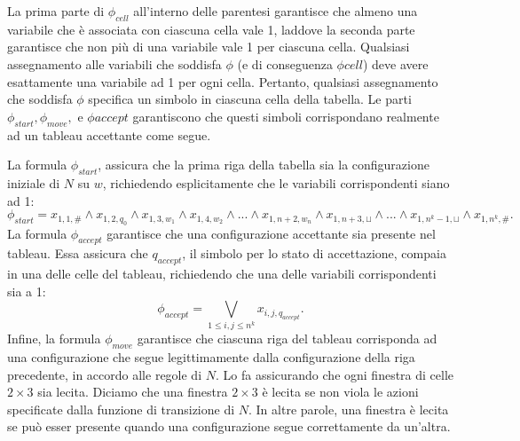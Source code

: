 \documentclass{article}
\begin{document}
La prima parte di $\phi_{cell}$ all'interno delle parentesi garantisce che almeno una variabile che è associata con ciascuna cella vale 1, laddove la seconda parte garantisce che non più di una variabile vale 1 per ciascuna cella.
Qualsiasi assegnamento alle variabili che soddisfa $\phi$ (e di conseguenza $\phi{cell}$) deve avere esattamente una variabile ad 1 per ogni cella.
Pertanto, qualsiasi assegnamento che soddisfa $\phi$ specifica un simbolo in ciascuna cella della tabella. 
Le parti $\phi_{start}, \phi_{move}, \text{ e } \phi{accept}$ garantiscono che questi simboli corrispondano realmente ad un tableau accettante come segue.

La formula $\phi_{start}$, assicura che la prima riga della tabella sia la configurazione iniziale di $N$ su $w$, richiedendo esplicitamente che le variabili corrispondenti siano ad 1:
$$
\phi_{start} = x_{1,1,\#} \land x_{1,2,q_0} \land 
x_{1,3,w_1} \land x_{1,4,w_2} \land ... \land x_{1,n+2,w_n} \land 
x_{1,n+3,\sqcup} \land ... \land x_{1,{n^k-1,\sqcup}} \land x_{1,n^k, \#}.
$$
La formula $\phi_{accept}$ garantisce che una configurazione accettante sia presente nel tableau.
Essa assicura che $q_{accept}$, il simbolo per lo stato di accettazione, compaia in una delle celle del tableau, richiedendo che una delle variabili corrispondenti sia a 1:
$$
\phi_{accept} = \bigvee_{1 \leq i,j \leq n^k} x_{i,j,q_{accept}}.
$$
Infine, la formula $\phi_{move}$ garantisce che ciascuna riga del tableau corrisponda ad una configurazione che segue legittimamente dalla configurazione della riga precedente, in accordo alle regole di $N$. 
Lo fa assicurando che ogni finestra di celle $2 \times 3$ sia lecita. 
Diciamo che una finestra $2 \times 3$ è lecita se non viola le azioni specificate dalla funzione di transizione di $N$. 
In altre parole, una finestra è lecita se può esser presente quando una configurazione segue correttamente da un'altra.
\end{document}
